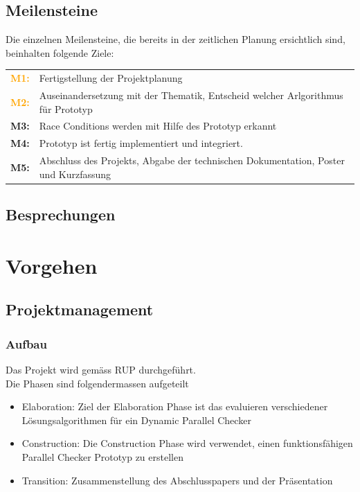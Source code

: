\documentclass[10pt,a4paper]{article}
\begin{document}
\subsection{Meilensteine}
\begin{flushleft}
	Die einzelnen Meilensteine, die bereits in der zeitlichen Planung ersichtlich sind, beinhalten folgende Ziele:
\end{flushleft}
\begin{tabular}{cl}
	\textcolor{Orange}{\textbf{M1:}} & Fertigstellung der Projektplanung\\[0.2cm]
	\textcolor{Orange}{\textbf{M2:}} & Auseinandersetzung mit der Thematik, Entscheid welcher Arlgorithmus für Prototyp\\[0.2cm]
	\textcolor{NavyBlue}{\textbf{M3:}} & Race Conditions werden mit Hilfe des Prototyp erkannt\\[0.2cm]
	\textcolor{NavyBlue}{\textbf{M4:}} & Prototyp ist fertig implementiert und integriert.\\[0.2cm]
	\textcolor{Dandelion}{\textbf{M5:}} & Abschluss des Projekts, Abgabe der technischen Dokumentation, Poster und Kurzfassung\\
\end{tabular}
\subsection{Besprechungen}
\newpage
\section{Vorgehen}
\subsection{Projektmanagement}
\subsubsection{Aufbau}
Das Projekt wird gemäss RUP durchgeführt.\\
Die Phasen sind folgendermassen aufgeteilt\\
\begin{itemize}
	\item Elaboration: Ziel der Elaboration Phase ist das evaluieren verschiedener Lösungsalgorithmen für ein Dynamic Parallel Checker
	\item Construction: Die Construction Phase wird verwendet, einen funktionsfähigen Parallel Checker Prototyp zu erstellen
	\item Transition: Zusammenstellung des Abschlusspapers und der Präsentation
\end{itemize}
\end{document}
